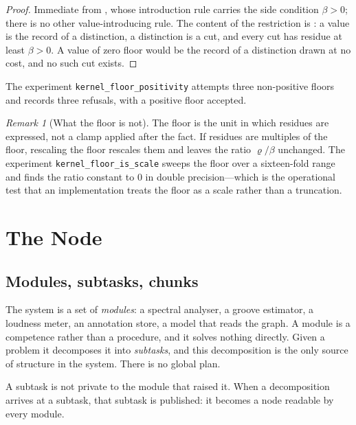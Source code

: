 \documentclass[11pt,twocolumn,a4paper]{article}
\theoremstyle{definition}
\theoremstyle{remark}
\newtheorem{remark}[theorem]{Remark}
\newcommand{\flo}{\beta}
\newcommand{\res}{\varrho}
\begin{document}
\begin{proof}
Immediate from , whose introduction rule carries the side
condition $\flo>0$; there is no other value-introducing rule. The content of the
restriction is : a value is the record of a distinction, a
distinction is a cut, and every cut has residue at least $\flo>0$. A value of
zero floor would be the record of a distinction drawn at no cost, and no such cut
exists.
\end{proof}

The experiment \texttt{kernel\_floor\_positivity} attempts three
non-positive floors and records three refusals, with a positive floor accepted.

\begin{remark}[What the floor is not]
\label{rem:not-clamp}
The floor is the unit in which residues are expressed, not a clamp applied after
the fact. If residues are multiples of the floor, rescaling the floor rescales
them and leaves the ratio $\res/\flo$ unchanged. The experiment
\texttt{kernel\_floor\_is\_scale} sweeps the floor over a sixteen-fold range and
finds the ratio constant to $0$ in double precision---which is the operational
test that an implementation treats the floor as a scale rather than a truncation.
\end{remark}

\section{The Node}
\label{sec:node}

\subsection{Modules, subtasks, chunks}

The system is a set of \emph{modules}: a spectral analyser, a groove estimator, a
loudness meter, an annotation store, a model that reads the graph. A module is a
competence rather than a procedure, and it solves nothing directly. Given a
problem it decomposes it into \emph{subtasks}, and this decomposition is the only
source of structure in the system. There is no global plan.

A subtask is not private to the module that raised it. When a decomposition
arrives at a subtask, that subtask is published: it becomes a node readable by
every module.
\end{document}

